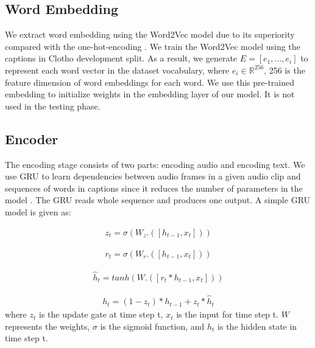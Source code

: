 \documentclass{article}
\begin{document}
\subsection{Word Embedding}

We extract word embedding using the Word2Vec model due to its superiority compared with the one-hot-encoding \cite{DBLP:journals/corr/MikolovSCCD13}. We train the Word2Vec model using the captions in Clotho development split. As a result, we generate $E=[e_1,...,e_i]$  to represent each word vector in the dataset vocabulary, where $e_i\in \mathbb{R}^{256}$, 256 is the feature dimension of word embeddings for each word. We use this pre-trained embedding to initialize weights in the embedding layer of our model. It is not used in the testing phase. 

\subsection{Encoder}

The encoding stage consists of two parts: encoding audio and encoding text. We use GRU to learn dependencies between audio frames in a given audio clip and sequences of words in captions since it reduces the number of parameters in the model \cite{DBLP:journals/corr/Lipton15}. The GRU reads whole sequence and produces one output. A simple GRU model is given as:

\begin{equation}
\begin{aligned}
z_t = \sigma(W_z.([h_{t-1},x_t]))
\end{aligned}
\end{equation} 

\begin{equation}
\begin{aligned}
r_t = \sigma(W_r.([h_{t-1},x_t]))
\end{aligned}
\end{equation} 

\begin{equation}
\begin{aligned}
\hat{h}_t = tanh(W.([r_t * h_{t-1},x_t]))
\end{aligned}
\end{equation} 

\begin{equation}
\begin{aligned}
h_t = (1-z_t) * h_{t-1} + z_t * \hat{h}_t
\end{aligned}
\end{equation} 
where  $z_t$ is the update gate at time step t, $x_t$ is the input for time step t. $W$ represents the weights, $\sigma$ is the sigmoid function, and $h_t$ is the hidden state in time step t.
\end{document}

